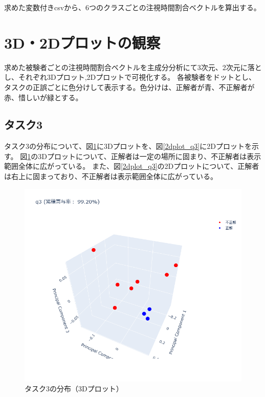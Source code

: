 \documentclass[paper=a4paper,fontsize=11pt]{jlreq}
\begin{document}
  求めた変数付きcsvから、6つのクラスごとの注視時間割合ベクトルを算出する。
  
  \section{3D・2Dプロットの観察}
    求めた被験者ごとの注視時間割合ベクトルを主成分分析にて3次元、2次元に落とし、それぞれ3Dプロット,2Dプロットで可視化する。
    各被験者をドットとし、タスクの正誤ごとに色分けして表示する。色分けは、正解者が青、不正解者が赤、惜しいが緑とする。
    \pagebreak

    \subsection{タスク3}
      タスク3の分布について、図\ref{3dplot_q3}に3Dプロットを、図\ref{2dplot_q3}に2Dプロットを示す。
      図\ref{3dplot_q3}の3Dプロットについて、正解者は一定の場所に固まり、不正解者は表示範囲全体に広がっている。
      また、図\ref{2dplot_q3}の2Dプロットについて、正解者は右上に固まっており、不正解者は表示範囲全体に広がっている。
      \begin{figure}[htbp]
        \centering
        \includegraphics[width=0.8\linewidth]{3dplot_q3.png}
        \caption{タスク3の分布（3Dプロット）}
        \label{3dplot_q3}
      \end{figure}
      \FloatBarrier
\end{document}
